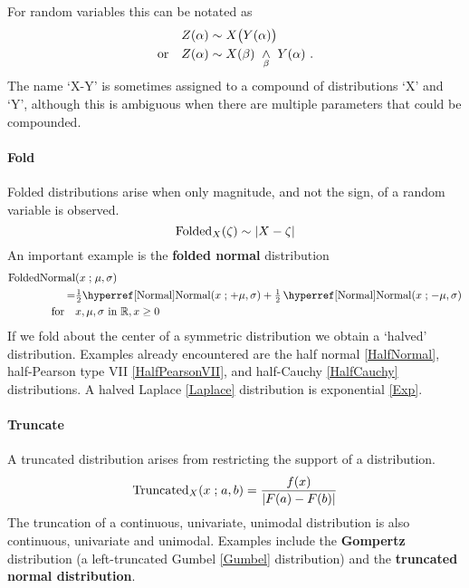 For random variables this can be notated as 
\begin{align*}
Z(\alpha) &\sim X\bigl( Y(\alpha) \bigr)  \\ 
\text{or}\quad
Z(\alpha) & \sim X(\beta) \ \underset{\beta}{\wedge}\  Y(\alpha)  \ .
\end{align*}
The name `X-Y' is sometimes assigned to a compound of distributions `X' and `Y', although this is ambiguous when there are multiple parameters that could be compounded.


\paragraph*{Fold}
Folded distributions arise when only magnitude, and not the sign, of a random variable is observed. 
\[
\operatorname{Folded}_X(\zeta) \sim |X-\zeta |
\notag 
\] 
An important %
example is the {\bf folded normal} distribution
\label{FoldedNormal}
\begin{align*}
\op{FoldedNormal}&(x\given \mu,\sigma) 
\\ \notag
= & \half  { \opr{Normal}(x\given +\mu,\sigma) +  \half \opr{Normal}(x\given -\mu,\sigma) } \checked
 \\ \notag
\text{for} \quad & x, \mu, \sigma  \text{ in } \mathbb{R}, x\geq0
\end{align*}
If we fold about  the  center of a symmetric distribution we obtain a `halved' distribution. Examples already encountered are the half normal  \eqref{HalfNormal}, half-Pearson type VII  \eqref{HalfPearsonVII}, and half-Cauchy \eqref{HalfCauchy} distributions. A halved Laplace \eqref{Laplace} distribution is exponential \eqref{Exp}. 



\paragraph*{Truncate} 

A truncated distribution arises from restricting the support of a distribution.
\[
\operatorname{Truncated}_X(x\mathrel{;} a,b) = \frac{f(x)}{|F(a) - F(b)|} 
\notag
\]
 The truncation of a continuous, univariate, unimodal distribution is also continuous, univariate and unimodal.
  Examples include the {\bf Gompertz} distribution (a left-truncated Gumbel \eqref{Gumbel} distribution) and the
  {\bf truncated normal distribution}. \label{Gompertz}\label{TruncatedNormal}

